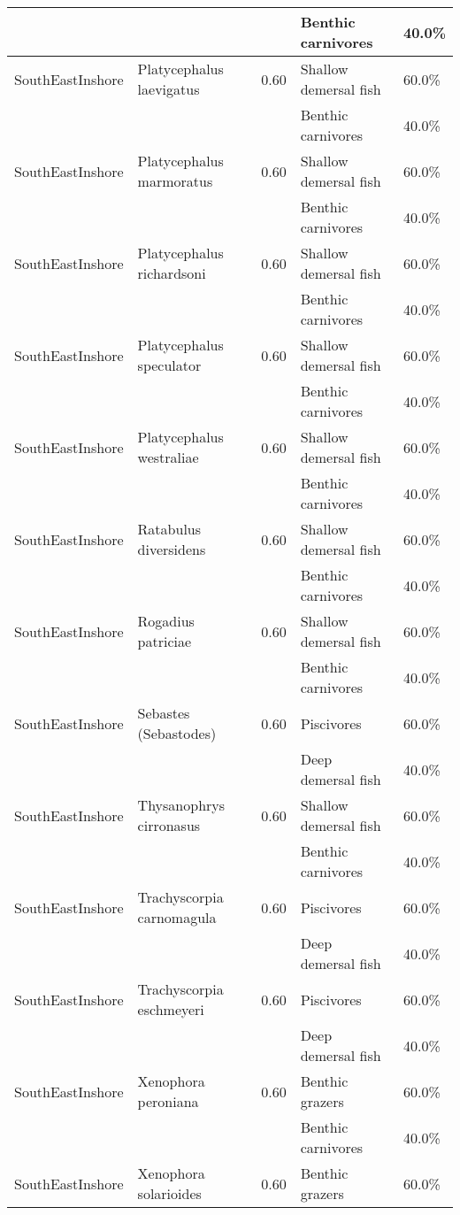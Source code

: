 \begin{longtable}{llcll}
& & & Benthic carnivores & 40.0\% \\
\hline
SouthEastInshore & Platycephalus laevigatus & 0.60 & Shallow demersal fish & 60.0\% \\
& & & Benthic carnivores & 40.0\% \\
\hline
SouthEastInshore & Platycephalus marmoratus & 0.60 & Shallow demersal fish & 60.0\% \\
& & & Benthic carnivores & 40.0\% \\
\hline
SouthEastInshore & Platycephalus richardsoni & 0.60 & Shallow demersal fish & 60.0\% \\
& & & Benthic carnivores & 40.0\% \\
\hline
SouthEastInshore & Platycephalus speculator & 0.60 & Shallow demersal fish & 60.0\% \\
& & & Benthic carnivores & 40.0\% \\
\hline
SouthEastInshore & Platycephalus westraliae & 0.60 & Shallow demersal fish & 60.0\% \\
& & & Benthic carnivores & 40.0\% \\
\hline
SouthEastInshore & Ratabulus diversidens & 0.60 & Shallow demersal fish & 60.0\% \\
& & & Benthic carnivores & 40.0\% \\
\hline
SouthEastInshore & Rogadius patriciae & 0.60 & Shallow demersal fish & 60.0\% \\
& & & Benthic carnivores & 40.0\% \\
\hline
SouthEastInshore & Sebastes (Sebastodes) & 0.60 & Piscivores & 60.0\% \\
& & & Deep demersal fish & 40.0\% \\
\hline
SouthEastInshore & Thysanophrys cirronasus & 0.60 & Shallow demersal fish & 60.0\% \\
& & & Benthic carnivores & 40.0\% \\
\hline
SouthEastInshore & Trachyscorpia carnomagula & 0.60 & Piscivores & 60.0\% \\
& & & Deep demersal fish & 40.0\% \\
\hline
SouthEastInshore & Trachyscorpia eschmeyeri & 0.60 & Piscivores & 60.0\% \\
& & & Deep demersal fish & 40.0\% \\
\hline
SouthEastInshore & Xenophora peroniana & 0.60 & Benthic grazers & 60.0\% \\
& & & Benthic carnivores & 40.0\% \\
\hline
SouthEastInshore & Xenophora solarioides & 0.60 & Benthic grazers & 60.0\% \\

\end{longtable}
